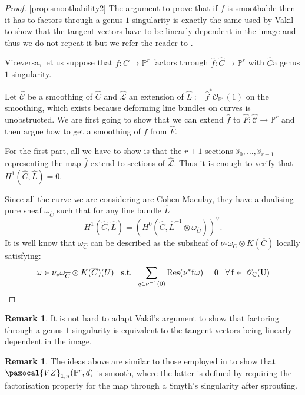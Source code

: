 \documentclass[11pt]{amsart}
\newcommand{\PP}{\mathbb P}
\newcommand{\OO}{\mathcal O}
\renewcommand{\to}{\rightarrow}
\newcommand{\cC}{\mathcal C}
\theoremstyle{plain}
\theoremstyle{definition}
\newtheorem{remark}[thm]{Remark}
\begin{document}
\begin{proof}\ref{prop:smoothability2}
 The argument to prove that if $f$ is smoothable then it has to factors through a genus $1$ singularity is exactly the same used by Vakil to show that the tangent vectors have to be linearly dependent in the image and thus we do not repeat it but we refer the reader to \cite{Vre}.
 
Viceversa, let us suppose that $f\colon C\to \PP^r$ factors through $\hat{f}\colon \hat{C}\to\PP^r$  with $\hat{C} $a genus $1$ singularity. 

Let $\hat{\cC}$ be a smoothing of $\hat{C}$ and $\hat{\mathcal L}$ an extension of $\hat{L}:=\hat{f}^*\OO_{\PP^r}(1)$ on the smoothing, which exists because deforming line bundles on curves is unobstructed.
We are first going to show that we can extend $\hat{f}$ to $\hat{F}\colon \hat{\cC}\to\PP^r$ and then argue how to get a smoothing of $f$ from $\hat{F}.$

For the first part, all we have to show is that the $r+1$ sections $\hat{s}_0,\dots, \hat{s}_{r+1}$ representing the map $\hat{f}$ extend to sections of $\hat{\mathcal{L}}.$
Thus it is enough to verify that $H^1(\hat{C},\hat{L})=0.$ 

Since all the curve we are considering are Cohen-Maculay, they have a dualising pure sheaf $\omega_{\hat{C}}$ such that for any line bundle $\hat{L}$
\[H^1(\hat{C},\hat{L})=(H^0(\hat{C},\hat{L}^{-1}\otimes\omega_{\hat{C}}))^{\vee}.\]
It is well know \cite[IV, \S~3]{serre} that  $\omega_{\hat{C}}$ can be described as the subsheaf of $\nu_* \omega_{\overline{C}}\otimes K(\overline{C})$ locally satisfying:
\[\omega\in \nu_* \omega_{\overline{C}}\otimes K(\overline{C})(U)\;\;\;\text{s.t.}\;\;\sum_{q\in \nu^{-1}(0)}\rm{Res}(\nu^*f\omega) =0\;\;\;\forall \,f\in\,\OO_C(U)\]

 
  
  \end{proof}






\begin{remark}
It is not hard to adapt Vakil's argument \cite{Vre} to show that factoring through a genus $1$ singularity is equivalent to the tangent vectors being linearly dependent in the image.
\end{remark}
\begin{remark}
The ideas above are similar to those employed in \cite[Theorem 4.5.1]{RSPW} to show that $\pazocal{VZ}_{1,n}(\PP^r,d)$ is smooth, where the latter is defined by requiring the factorisation property for the map through a Smyth's singularity after sprouting.
\end{remark}
\end{document}
